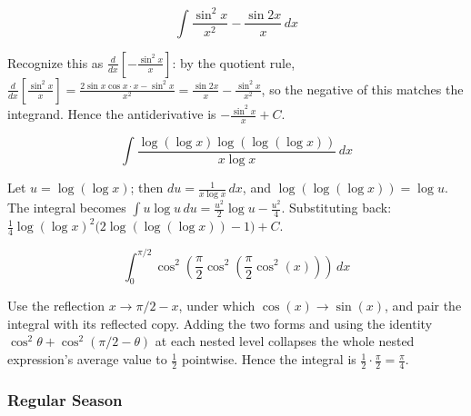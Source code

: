 \begin{questions}
\question
\[\int \frac{\sin^2x}{x^2}-\frac{\sin2x}{x}\,dx\]
\begin{solution}
Recognize this as $\frac{d}{dx}\left[-\frac{\sin^2x}{x}\right]$: by the quotient rule, $\frac{d}{dx}\left[\frac{\sin^2x}{x}\right] = \frac{2\sin x\cos x\cdot x-\sin^2x}{x^2} = \frac{\sin2x}{x}-\frac{\sin^2x}{x^2}$, so the negative of this matches the integrand. Hence the antiderivative is $-\frac{\sin^2x}{x}+C$.
\end{solution}

\question
\[\int \frac{\log(\log x)\log(\log(\log x))}{x\log x}\,dx\]
\begin{solution}
Let $u=\log(\log x)$; then $du = \frac{1}{x\log x}\,dx$, and $\log(\log(\log x)) = \log u$. The integral becomes $\int u\log u\,du = \frac{u^2}2\log u-\frac{u^2}4$. Substituting back: $\frac14\log(\log x)^2\big(2\log(\log(\log x))-1\big)+C$.
\end{solution}

\question
\[\int_0^{\pi/2}\cos^2\left(\frac\pi2\cos^2\left(\frac\pi2\cos^2(x)\right)\right)\,dx\]
\begin{solution}
Use the reflection $x\to\pi/2-x$, under which $\cos(x)\to\sin(x)$, and pair the integral with its reflected copy. Adding the two forms and using the identity $\cos^2\theta+\cos^2(\pi/2-\theta)$ at each nested level collapses the whole nested expression's average value to $\frac12$ pointwise. Hence the integral is $\frac12\cdot\frac\pi2=\frac\pi4$.
\end{solution}

\end{questions}

\subsubsection*{Regular Season}

